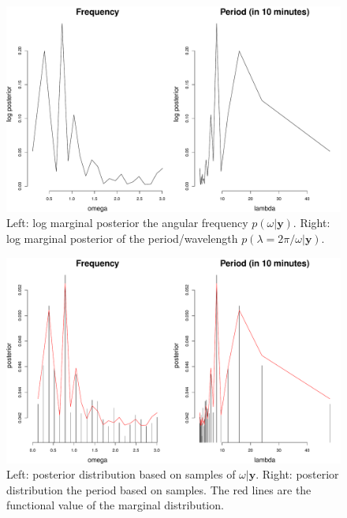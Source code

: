 \documentclass[12pt]{article}
\newcommand{\m}[1]{\mathbf{\bm{#1}}}
\begin{document}
\begin{figure}[H]
\begin{center}
\includegraphics[scale=0.34]{fp_lh.pdf}
\end{center}
\caption{Left: log marginal posterior the angular frequency $p(\omega|\m{y})$. Right: log marginal posterior of the period/wavelength $p(\lambda=2\pi/\omega|\m{y})$.}
\end{figure}

\begin{figure}[H]
\begin{center}
\includegraphics[scale=0.34]{sp_lh.pdf}
\end{center}
\caption{Left: posterior distribution based on samples of $\omega|\m{y}$. Right: posterior distribution the period based on samples. The red lines are the functional value of the marginal distribution.}
\end{figure}
\end{document}
